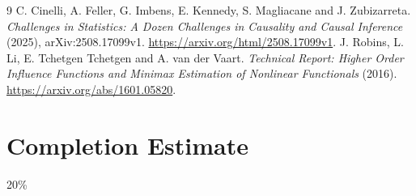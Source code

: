 \documentclass[11pt]{article}
\theoremstyle{definition}
\begin{document}
\begin{thebibliography}{9}
 C. Cinelli, A. Feller, G. Imbens, E. Kennedy, S. Magliacane and J. Zubizarreta.
\emph{Challenges in Statistics: A Dozen Challenges in Causality and Causal Inference} (2025), arXiv:2508.17099v1.
\url{https://arxiv.org/html/2508.17099v1}.
 J. Robins, L. Li, E. Tchetgen Tchetgen and A. van der Vaart.
\emph{Technical Report: Higher Order Influence Functions and Minimax Estimation of Nonlinear Functionals} (2016).
\url{https://arxiv.org/abs/1601.05820}.
\end{thebibliography}
\section{Completion Estimate}
20\%
\end{document}
